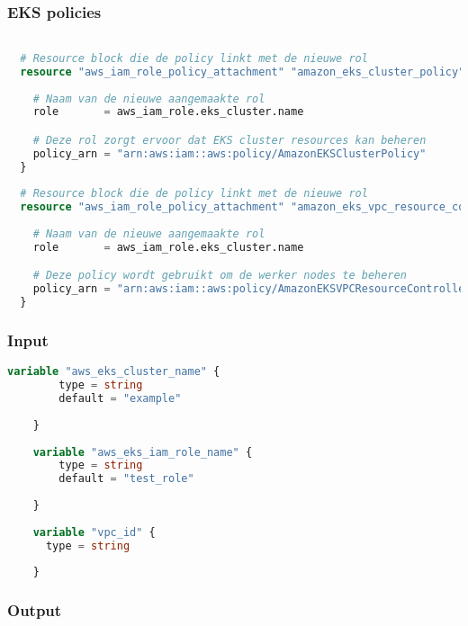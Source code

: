 \subsubsection{
{EKS policies}}
\label{sec:EKS policies}

\begin{lstlisting}[language=terraform]

  # Resource block die de policy linkt met de nieuwe rol
  resource "aws_iam_role_policy_attachment" "amazon_eks_cluster_policy" {
    
    # Naam van de nieuwe aangemaakte rol
    role       = aws_iam_role.eks_cluster.name

    # Deze rol zorgt ervoor dat EKS cluster resources kan beheren
    policy_arn = "arn:aws:iam::aws:policy/AmazonEKSClusterPolicy"
  }
  
  # Resource block die de policy linkt met de nieuwe rol
  resource "aws_iam_role_policy_attachment" "amazon_eks_vpc_resource_controller" {
    
    # Naam van de nieuwe aangemaakte rol
    role       = aws_iam_role.eks_cluster.name

    # Deze policy wordt gebruikt om de werker nodes te beheren
    policy_arn = "arn:aws:iam::aws:policy/AmazonEKSVPCResourceController"
  }
\end{lstlisting}

\subsubsection{
{Input}}

\begin{lstlisting}[language=terraform]
    variable "aws_eks_cluster_name" {
        type = string
        default = "example"
      
    }
    
    variable "aws_eks_iam_role_name" {
        type = string
        default = "test_role"
      
    }
    
    variable "vpc_id" {
      type = string
      
    }
\end{lstlisting}

\subsubsection{
{Output}}

